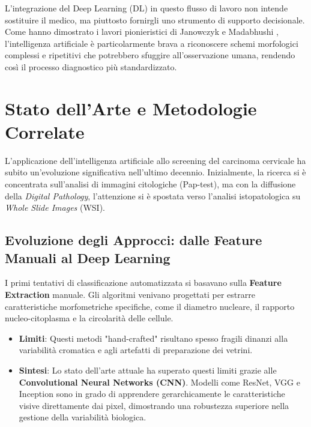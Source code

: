 L'integrazione del Deep Learning (DL) in questo flusso di lavoro non intende sostituire il medico, ma piuttosto fornirgli uno strumento di supporto decisionale. Come hanno dimostrato i lavori pionieristici di Janowczyk e Madabhushi \cite{janowczyk2016deep}, l'intelligenza artificiale è particolarmente brava a riconoscere schemi morfologici complessi e ripetitivi che potrebbero sfuggire all'osservazione umana, rendendo così il processo diagnostico più standardizzato.

\section{Stato dell'Arte e Metodologie Correlate}
L'applicazione dell'intelligenza artificiale allo screening del carcinoma cervicale ha subito un'evoluzione significativa nell'ultimo decennio. Inizialmente, la ricerca si è concentrata sull'analisi di immagini citologiche (Pap-test), ma con la diffusione della \textit{Digital Pathology}, l'attenzione si è spostata verso l'analisi istopatologica su \textit{Whole Slide Images} (WSI).

\subsection{\small Evoluzione degli Approcci: dalle Feature Manuali al Deep Learning}
I primi tentativi di classificazione automatizzata si basavano sulla \textbf{Feature Extraction} manuale. Gli algoritmi venivano progettati per estrarre caratteristiche morfometriche specifiche, come il diametro nucleare, il rapporto nucleo-citoplasma e la circolarità delle cellule. 
\begin{itemize}
    \item \textbf{Limiti}: Questi metodi "hand-crafted" risultano spesso fragili dinanzi alla variabilità cromatica e agli artefatti di preparazione dei vetrini.
    \item \textbf{Sintesi}: Lo stato dell'arte attuale ha superato questi limiti grazie alle \textbf{Convolutional Neural Networks (CNN)}. Modelli come ResNet, VGG e Inception sono in grado di apprendere gerarchicamente le caratteristiche visive direttamente dai pixel, dimostrando una robustezza superiore nella gestione della variabilità biologica.
\end{itemize}



